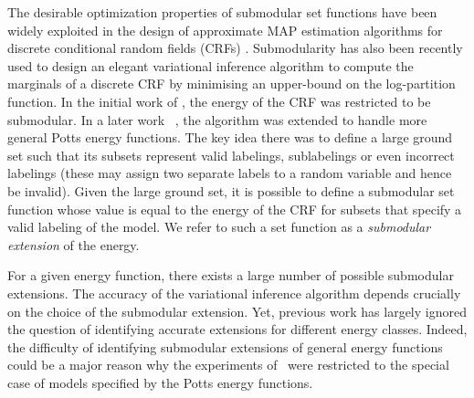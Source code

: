 The desirable optimization properties of submodular set functions have been
widely exploited in the design of approximate MAP estimation algorithms for
discrete conditional random fields (CRFs) \citep{boykov2001fast,
kumar2011improved}. Submodularity has also been recently used to design an
elegant variational inference algorithm to compute the marginals of a discrete
CRF by minimising an upper-bound on the log-partition function. In the initial
work of \citep{djolonga2014map}, the energy of the CRF was restricted to be
submodular. In a later work ~\citep{zhang2015higher}, the algorithm was
extended to handle more general Potts energy functions. The key idea there was to define a large ground set such that its subsets represent valid labelings, sublabelings or even incorrect labelings (these may assign two separate labels to a random variable and hence be invalid). Given the large ground set, it is possible to define a submodular set function whose value is equal to the energy of the CRF for subsets that specify a valid labeling of the model. We refer to such a set function as a {\em submodular extension} of the energy. 

For a given energy function, there exists a large number of possible submodular extensions. The accuracy of the variational inference algorithm depends crucially on the choice of the submodular extension. Yet, previous work has largely ignored the question of identifying accurate extensions for different energy classes. Indeed, the difficulty of identifying submodular extensions of general energy functions could be a major reason why the experiments of~\citep{zhang2015higher} were restricted to the special case of models specified by the Potts energy functions.

